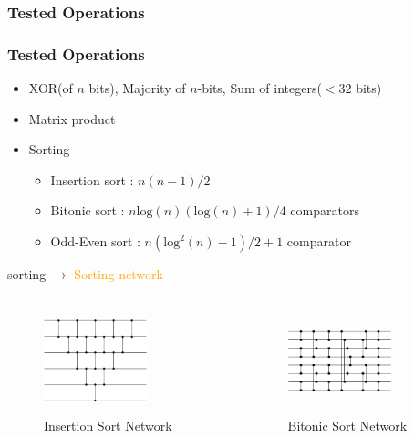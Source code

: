 \documentclass{beamer}
\begin{document}
\subsubsection{Tested Operations}
\begin{frame} \frametitle{Tested Operations}
  \begin{itemize}
  \item XOR(of $n$ bits), Majority of $n$-bits, Sum of integers($<32$ bits)
   \item Matrix product
  \item Sorting
   \begin{itemize}
   \item Insertion sort : $n(n-1)/2$
   \item Bitonic sort : $n\mathrm{log}(n)(\mathrm{log}(n)+1)/4$ comparators
    \item Odd-Even sort : $n(\mathrm{log}^{2}(n)-1)/2 + 1 $ comparator
   \end{itemize}
\end{itemize}
sorting $\rightarrow$ \textcolor{orange}{Sorting network}
\begin{columns}
\begin{column}[c]{3cm}
\begin{figure}%
\vspace{-3ex}
\centering
\includegraphics[width=3cm, height=3cm]{network.png} 
\caption{Insertion Sort Network } 
\end{figure}
\end{column}
\begin{column}[c]{3cm}
\begin{figure}
\vspace{-3ex}
\centering
\includegraphics[width=3cm, height=3cm]{networkBitonic.png} 
\caption{Bitonic Sort Network } 

\end{figure}
\end{column}
\end{columns}
\end{frame}
\end{document}
